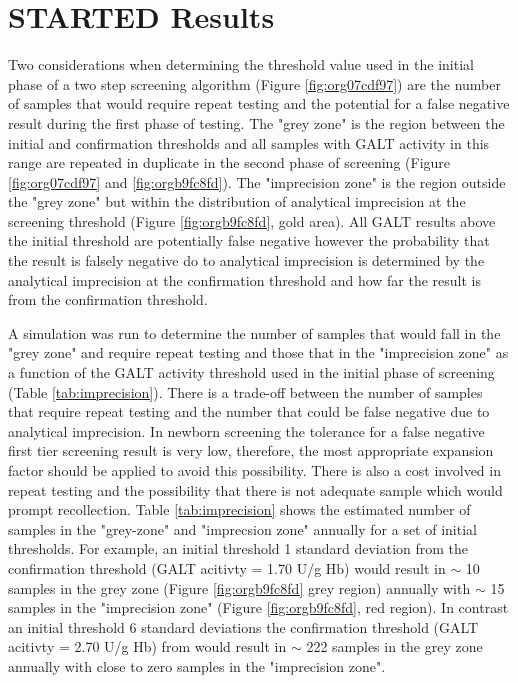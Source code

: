 \documentclass[review]{elsarticle}
\begin{document}
\section*{{\bfseries\sffamily STARTED} Results}
\label{sec:org94abdc8}

Two considerations when determining the threshold value used in the
initial phase of a two step screening algorithm (Figure \ref{fig:org07cdf97})
are the number of samples that would require repeat testing and the
potential for a false negative result during the first phase of
testing.  The "grey zone" is the region between the initial and
confirmation thresholds and all samples with GALT activity in this
range are repeated in duplicate in the second phase of screening
(Figure \ref{fig:org07cdf97} and \ref{fig:orgb9fc8fd}). The "imprecision zone" is
the region outside the "grey zone" but within the distribution of
analytical imprecision at the screening threshold (Figure
\ref{fig:orgb9fc8fd}, gold area). All GALT results above the initial
threshold are potentially false negative however the probability that
the result is falsely negative do to analytical imprecision is
determined by the analytical imprecision at the confirmation threshold
and how far the result is from the confirmation threshold.

A simulation was run to determine the number of samples that would
fall in the "grey zone" and require repeat testing and those that in
the "imprecision zone" as a function of the GALT activity threshold
used in the initial phase of screening (Table
\ref{tab:imprecision}). There is a trade-off between the number of
samples that require repeat testing and the number that could be false
negative due to analytical imprecision. In newborn screening the
tolerance for a false negative first tier screening result is very
low, therefore, the most appropriate expansion factor should be
applied to avoid this possibility. There is also a cost involved in
repeat testing and the possibility that there is not adequate sample
which would prompt recollection. Table \ref{tab:imprecision} shows the
estimated number of samples in the "grey-zone" and "imprecsion zone"
annually for a set of initial thresholds. For example, an initial
threshold 1 standard deviation from the confirmation threshold (GALT
acitivty = 1.70 U/g Hb) would result in \(\sim\) 10 samples in the grey
zone (Figure \ref{fig:orgb9fc8fd} grey region) annually with \(\sim\) 15
samples in the "imprecision zone" (Figure \ref{fig:orgb9fc8fd}, red
region). In contrast an initial threshold 6 standard deviations the
confirmation threshold (GALT acitivty = 2.70 U/g Hb) from would result
in \(\sim\) 222 samples in the grey zone annually with close to zero samples in the
"imprecision zone".
\end{document}
